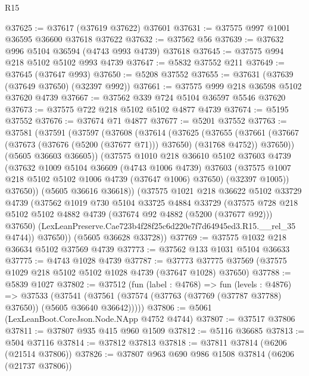 \begin{lexlean}{R15}
\begin{coremodule}
{{{{{{{{{{{@37625 := @37617 (@37619 @37622) @37601
@37631 := @37575 @997 @1001 @36595 @36600 @37618 @37622
@37632 := @37562 @56
@37639 := @37632 @996 @5104 @36594 (@4743 @993 @4739) @37618
@37645 := @37575 @994 @218 @5102 @5102 @993 @4739
@37647 := @5832 @37552 @211
@37649 := @37645 (@37647 @993)
@37650 := @5208 @37552
@37655 := @37631 (@37639 (@37649 @37650) (@32397 @992))
@37661 := @37575 @999 @218 @36598 @5102 @37620 @4739
@37667 := @37562 @339 @724 @5104 @36597 @5546 @37620
@37673 := @37575 @722 @218 @5102 @5102 @4877 @4739
@37674 := @5195 @37552
@37676 := @37674 @71 @4877
@37677 := @5201 @37552
@37763 := @37581
    (@37591
      (@37597
        (@37608
          (@37614
            (@37625
              (@37655
                (@37661
                  (@37667 (@37673 (@37676 (@5200 (@37677 @71))) @37650) (@31768 @4752))
                  @37650))
              (@5605 @36603 @36605))
            (@37575
              @1010
              @218
              @36610
              @5102
              @37603
              @4739
              (@37632
                @1009
                @5104
                @36609
                (@4743 @1006 @4739)
                @37603
                (@37575 @1007 @218 @5102 @5102 @1006 @4739 (@37647 @1006) @37650)
                (@32397 @1005))
              @37650))
          (@5605 @36616 @36618))
        (@37575
          @1021
          @218
          @36622
          @5102
          @33729
          @4739
          (@37562
            @1019
            @730
            @5104
            @33725
            @4884
            @33729
            (@37575
              @728
              @218
              @5102
              @5102
              @4882
              @4739
              (@37674 @92 @4882 (@5200 (@37677 @92)))
              @37650)
            (LexLeanPreserve.Cae723b4f28f25c6d220e7f7d64945ed3.R15.__rel_35 @4744))
          @37650))
      (@5605 @36628 @33728))
@37769 := @37575 @1032 @218 @36634 @5102 @37569 @4739
@37773 := @37562 @133 @1031 @5104 @36633
@37775 := @4743 @1028 @4739
@37787 := @37773 @37775 @37569 (@37575 @1029 @218 @5102 @5102 @1028 @4739 (@37647 @1028) @37650)
@37788 := @5839 @1027
@37802 := @37512
    (fun (label : @4768) =>
    fun (levels : @4876) =>
    @37533
      (@37541 (@37561 (@37574 (@37763 (@37769 (@37787 @37788) @37650)) (@5605 @36640 @36642)))))
@37806 := @5061 (LexLeanBoot.CoreJson.Node.NApp @4752 @4744)
@37807 := @37517 @37806
@37811 := @37807 @935 @415 @960 @1509
@37812 := @5116 @36685
@37813 := @504 @37116
@37814 := @37812 @37813
@37818 := @37811 @37814 (@6206 (@21514 @37806))
@37826 := @37807 @963 @690 @986 @1508 @37814 (@6206 (@21737 @37806))
}}}}}}}}}}}
\end{coremodule}
\end{lexlean}
